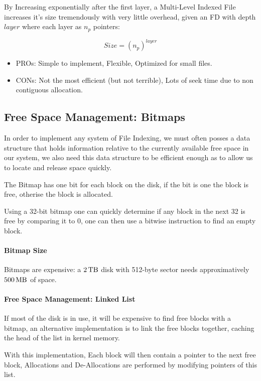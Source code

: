 \documentclass[openright, twoside]{report}
\theoremstyle{definition}
\theoremstyle{example}
\begin{document}
By Increasing exponentially after the first layer, a Multi-Level Indexed File increases it's 
size tremendously with very little overhead, given an FD with depth $layer$ where each layer as $n_p$ pointers:

\[
	Size = {(n_{p})}^{layer}	
\]

\begin{itemize}
	\item PROs: Simple to implement, Flexible, Optimized for small files.
	\item CONs: Not the most efficient (but not terrible), Lots of seek time due to non contiguous allocation.
\end{itemize}

\subsection{Free Space Management: Bitmaps}
In order to implement any system of File Indexing, we must often posses a data structure that 
holds information relative to the currently available free space in our system, we also 
need this data structure to be efficient enough as to allow us to locate and release space quickly.

The Bitmap has one bit for each block on the disk, 
if the bit is one the block is free, otherise the block is allocated.

Using a 32-bit bitmap one can quickly determine if any block in the next 32 is free by 
comparing it to 0, one can then use a bitwise instruction to find an empty block.

\paragraph{Bitmap Size}
Bitmaps are expensive: a $\SI{2}{\tera\byte}$ disk with 512-byte sector needs 
approximatively $\SI{500}{\mega\byte}$ of space.

\paragraph{Free Space Management: Linked List}
If most of the disk is in use, it will be expensive to find free blocks with a bitmap, an 
alternative implementation is to link the free blocks together, caching the head of the list 
in kernel memory.

With this implementation, Each block will then contain a pointer to the next free block, Allocations 
and De-Allocations are performed by modifying pointers of this list.
\end{document}
